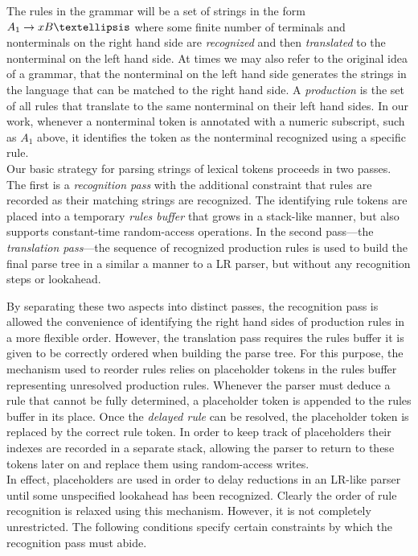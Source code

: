 \documentclass[envcountsame,runningheads]{llncs}
\begin{document}
The rules in the grammar will be a set of strings in the form $A_1 \rightarrow x B \textellipsis$ where some finite number of terminals and nonterminals on the right hand side are \emph{recognized} and then \emph{translated} to the nonterminal on the left hand side.
At times we may also refer to the original idea of a grammar, that the nonterminal on the left hand side generates the strings in the language that can be matched to the right hand side.
A \emph{production} is the set of all rules that translate to the same nonterminal on their left hand sides.
In our work, whenever a nonterminal token is annotated with a numeric subscript, such as $A_1$ above, it identifies the token as the nonterminal recognized using a specific rule.\\

Our basic strategy for parsing strings of lexical tokens proceeds in two passes.
The first is a \emph{recognition pass} with the additional constraint that rules are recorded as their matching strings are recognized.
The identifying rule tokens are placed into a temporary \emph{rules buffer} that grows in a stack-like manner, but also supports constant-time random-access operations.
In the second pass---the \emph{translation pass}---the sequence of recognized production rules is used to build the final parse tree in a similar a manner to a LR parser, but without any recognition steps or lookahead.

By separating these two aspects into distinct passes, the recognition pass is allowed the convenience of identifying the right hand sides of production rules in a more flexible order. 
However, the translation pass requires the rules buffer it is given to be correctly ordered when building the parse tree.
For this purpose, the mechanism used to reorder rules relies on placeholder tokens in the rules buffer representing unresolved production rules.
Whenever the parser must deduce a rule that cannot be fully determined, a placeholder token is appended to the rules buffer in its place. 
Once the \emph{delayed rule} can be resolved, the placeholder token is replaced by the correct rule token.
In order to keep track of placeholders their indexes are recorded in a separate stack, allowing the parser to return to these tokens later on and replace them using random-access writes.\\

In effect, placeholders are used in order to delay reductions in an LR-like parser until some unspecified lookahead has been recognized.
Clearly the order of rule recognition is relaxed using this mechanism.
However, it is not completely unrestricted.
The following conditions specify certain constraints by which the recognition pass must abide.
\end{document}
